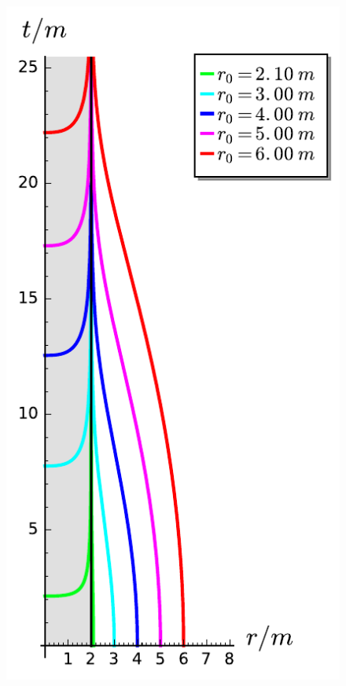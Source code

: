 \begin{figure}
\centerline{\includegraphics[height=0.5\textheight]{ges_radial_infall_t.pdf}\qquad\qquad
}
\end{figure}
